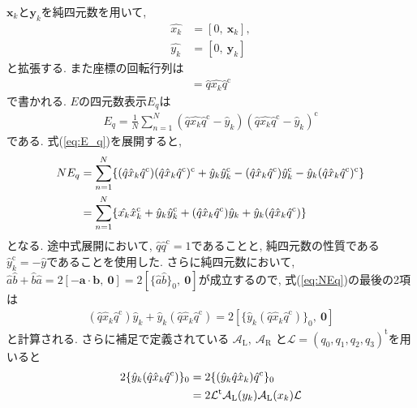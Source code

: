 $\mathbf{x}_{k}$と$\mathbf{y}_{k}$を純四元数を用いて,
\begin{align}
 \hat{x_{k}} &= [0,~ \mathbf{x}_{k}], \\
 \hat{y_{k}} &= [0,~ \mathbf{y}_{k}]
\end{align}
と拡張する. また座標の回転行列は
\begin{align}
  [0,~ \mathcal{U}(\hat{q}) \mathbf{x}_{k}] 
 =
  \hat{q} \hat{x_{k}} \hat{q}^{\mathrm{c}}
\end{align}
で書かれる. $E$の四元数表示$E_{q}$は
\begin{align}
   E_{q}
 =
   \frac{1}{N} \sum_{n=1}^{N} 
   (\hat{q} \hat{x_{k}} \hat{q}^{\mathrm{c}} - \hat{y}_{k})
   (\hat{q} \hat{x_{k}} \hat{q}^{\mathrm{c}} - \hat{y}_{k})^{\mathrm{c}}
 \label{eq:E_q}
\end{align}
である. 式(\ref{eq:E_q})を展開すると,
\begin{align}
   N E_{q}
&=
  \sum_{n=1}^{N}
  \{
     (\hat{q} \hat{x}_{k} \hat{q}^{\mathrm{c}})
     (\hat{q} \hat{x}_{k} \hat{q}^{\mathrm{c}})^{\mathrm{c}}
    +
      \hat{y}_{k} \hat{y}_{k}^{\mathrm{c}}
    - 
      (\hat{q} \hat{x}_{k} \hat{q}^{\mathrm{c}}) \hat{y}_{k}^{\mathrm{c}}
    -
      \hat{y}_{k} (\hat{q} \hat{x}_{k} \hat{q}^{\mathrm{c}})^{\mathrm{c}}
  \}
 \notag
 \\
&=
  \sum_{n=1}^{N}
  \{
      \hat{x_{k}} \hat{x}_{k}^{\mathrm{c}} 
    +
      \hat{y}_{k} \hat{y}_{k}^{\mathrm{c}}
    + 
      (\hat{q} \hat{x}_{k} \hat{q}^{\mathrm{c}}) \hat{y}_{k}
    +
      \hat{y}_{k} (\hat{q} \hat{x}_{k} \hat{q}^{\mathrm{c}})
  \}
 \label{eq:NEq}
\end{align}
となる. 途中式展開において, $\hat{q}\hat{q}^{\mathrm{c}}=1$であることと,
純四元数の性質である$\hat{y}_{k}^{\mathrm{c}}=-\hat{y}$であることを使用した.
さらに純四元数において, 
$\hat{a}\hat{b} + \hat{b}\hat{a} = 2[-\mathbf{a}\cdot\mathbf{b},~ \mathbf{0}]
= 2[\{\hat{a}\hat{b}\}_{0},~ \mathbf{0}]$が成立するので, 式(\ref{eq:NEq})の最後の2項は
\begin{align}
   (\hat{q} \hat{x}_{k} \hat{q}^{\mathrm{c}}) \hat{y}_{k}
 +
   \hat{y}_{k} (\hat{q} \hat{x}_{k} \hat{q}^{\mathrm{c}})
 =
   2[\{\hat{y}_{k} (\hat{q} \hat{x}_{k} \hat{q}^{\mathrm{c}})\}_{0},~ \mathbf{0}]
\end{align}
と計算される. さらに補足で定義されている
$\mathcal{A}_{\mathrm{L}},~\mathcal{A}_{\mathrm{R}}$
と$\mathcal{L}=(q_{0}, q_{1}, q_{2}, q_{3})^{\mathrm{t}}$を用いると
\begin{align}
  2\{\hat{y}_{k} (\hat{q} \hat{x}_{k} \hat{q}^{\mathrm{c}})\}_{0}
&=
  2\{(\hat{y}_{k} \hat{q} \hat{x}_{k}) \hat{q}^{\mathrm{c}}\}_{0}
 \notag
 \\
&=
  2\mathcal{L}^{\mathrm{t}} 
   \mathcal{A}_{\mathrm{L}} (y_{k}) \mathcal{A}_{\mathrm{L}} (x_{k})
   \mathcal{L}
\end{align}
